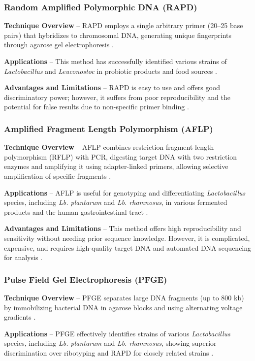 \subsubsection{Random Amplified Polymorphic DNA (RAPD)}
\textbf{Technique Overview} – RAPD employs a single arbitrary primer (20–25 base pairs) that hybridizes to chromosomal DNA, generating unique fingerprints through agarose gel electrophoresis \cite*{L4-MolTyping}.

\textbf{Applications} – This method has successfully identified various strains of \textit{Lactobacillus} and \textit{Leuconostoc} in probiotic products and food sources \cite*{L4-MolTyping}.

\textbf{Advantages and Limitations} – RAPD is easy to use and offers good discriminatory power; however, it suffers from poor reproducibility and the potential for false results due to non-specific primer binding \cite*{L4-MolTyping}.

\subsubsection{Amplified Fragment Length Polymorphism (AFLP)}
\textbf{Technique Overview} – AFLP combines restriction fragment length polymorphism (RFLP) with PCR, digesting target DNA with two restriction enzymes and amplifying it using adapter-linked primers, allowing selective amplification of specific fragments \cite*{L4-MolTyping}.

\textbf{Applications} – AFLP is useful for genotyping and differentiating \textit{Lactobacillus} species, including \textit{Lb. plantarum} and \textit{Lb. rhamnosus}, in various fermented products and the human gastrointestinal tract \cite*{L4-MolTyping}.

\textbf{Advantages and Limitations} – This method offers high reproducibility and sensitivity without needing prior sequence knowledge. However, it is complicated, expensive, and requires high-quality target DNA and automated DNA sequencing for analysis \cite*{L4-MolTyping}.

\subsubsection{Pulse Field Gel Electrophoresis (PFGE)}
\textbf{Technique Overview} – PFGE separates large DNA fragments (up to 800 kb) by immobilizing bacterial DNA in agarose blocks and using alternating voltage gradients \cite*{L4-MolTyping}.

\textbf{Applications} – PFGE effectively identifies strains of various \textit{Lactobacillus} species, including \textit{Lb. plantarum} and \textit{Lb. rhamnosus}, showing superior discrimination over ribotyping and RAPD for closely related strains \cite*{L4-MolTyping}.

